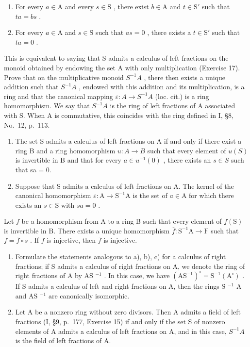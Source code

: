 \begin{enumerate}
\def\labelenumi{(\roman{enumi})}
\item
  For every \(a \in \mathrm{A}\) and every \(s \in \mathrm{S}\) , there exist \(b \in \mathrm{A}\) and \(t \in \mathrm{S}'\) such that \(ta = bs\) .
\item
  For every \(a \in \mathrm{A}\) and \(s \in \mathrm{S}\) such that \(as = 0\) , there exists a \(t \in \mathrm{S}'\) such that \(ta = 0\) .
\end{enumerate}

This is equivalent to saying that S admits a calculus of left fractions on the monoid obtained by endowing the set A with only multiplication (Exercise 17). Prove that on the multiplicative monoid \(S^{-1}A\) , there then exists a unique addition such that \(S^{-1}A\) , endowed with this addition and its multiplication, is a ring and that the canonical mapping \(\varepsilon: A \to S^{-1}A\) (loc. cit.) is a ring homomorphism. We say that \(S^{-1}A\) is the ring of left fractions of A associated with S. When A is commutative, this coincides with the ring defined in I, §8, No.~12, p.~113.

\begin{enumerate}
\def\labelenumi{\alph{enumi})}
\setcounter{enumi}{1}
\item
  The set S admits a calculus of left fractions on A if and only if there exist a ring B and a ring homomorphism \(u: A \to B\) such that every element of \(u(S)\) is invertible in B and that for every \(a \in u^{-1}(0)\) , there exists an \(s \in S\) such that sa = 0.
\item
  Suppose that S admits a calculus of left fractions on A. The kernel of the canonical homomorphism \(\varepsilon : \mathrm{A} \to \mathrm{S}^{-1}\mathrm{A}\) is the set of \(a \in \mathrm{A}\) for which there exists an \(s \in \mathrm{S}\) with \(sa = 0\) .
\end{enumerate}

Let \(f\) be a homomorphism from A to a ring B such that every element of \(f(\mathrm{S})\) is invertible in B. There exists a unique homomorphism \(\overline{f} : \mathrm{S}^{-1}\mathrm{A} \to \mathrm{F}\) such that \(f = \overline{f} \circ s\) . If \(f\) is injective, then \(\overline{f}\) is injective.

\begin{enumerate}
\def\labelenumi{\alph{enumi})}
\setcounter{enumi}{3}
\item
  Formulate the statements analogous to a), b), c) for a calculus of right fractions; if S admits a calculus of right fractions on A, we denote the ring of right fractions of A by AS \(^{-1}\) . In this case, we have \((\mathrm{AS}^{-1})^{\circ} = \mathrm{S}^{-1}(\mathrm{A}^{\circ})\) . If S admits a calculus of left and right fractions on A, then the rings S \(^{-1}\) A and AS \(^{-1}\) are canonically isomorphic.
\item
  Let A be a nonzero ring without zero divisors. Then A admits a field of left fractions (I, §9, p.~177, Exercise 15) if and only if the set S of nonzero elements of A admits a calculus of left fractions on A, and in this case, \(S^{-1}A\) is the field of left fractions of A.
\end{enumerate}

